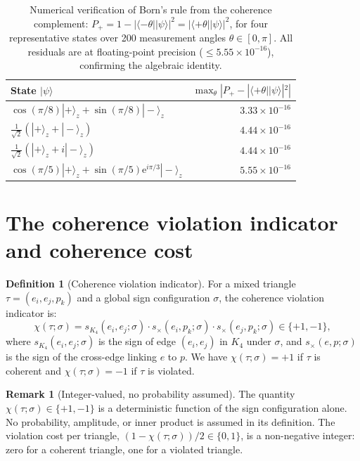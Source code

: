 \documentclass[11pt,a4paper]{article}
\theoremstyle{definition}
\newtheorem{definition}[theorem]{Definition}
\newtheorem{remark}[theorem]{Remark}
\newcommand{\Kfour}{K_4}
\newcommand{\pket}[1]{|#1\rangle}
\newcommand{\pbra}[1]{\langle#1|}
\begin{document}
\begin{table}[ht]
\centering
\caption{Numerical verification of Born's rule from the coherence complement: $P_+ = 1 - |\pbra{-\theta}\pket{\psi}|^2 = |\pbra{+\theta}\pket{\psi}|^2$, for four representative states over 200 measurement angles $\theta \in [0,\pi]$. All residuals are at floating-point precision ($\leq 5.55\times10^{-16}$), confirming the algebraic identity.}

\bigskip

\label{tab:born_check}
\begin{tabular}{lr}
\toprule
State $\pket{\psi}$ & $\max_\theta |P_+ - |\pbra{+\theta}\pket{\psi}|^2|$ \\
\midrule
$\cos(\pi/8)\pket{+}_z + \sin(\pi/8)\pket{-}_z$ & $3.33\times10^{-16}$ \\
$\tfrac{1}{\sqrt{2}}(\pket{+}_z + \pket{-}_z)$ & $4.44\times10^{-16}$ \\
$\tfrac{1}{\sqrt{2}}(\pket{+}_z + i\pket{-}_z)$ & $4.44\times10^{-16}$ \\
$\cos(\pi/5)\pket{+}_z + \sin(\pi/5)\mathrm{e}^{i\pi/3}\pket{-}_z$ & $5.55\times10^{-16}$ \\
\bottomrule
\end{tabular}
\end{table}

\section{The coherence violation indicator and coherence cost}
\label{sec:chi}

\begin{definition}[Coherence violation indicator]
\label{def:chi}
For a mixed triangle $\tau = (e_i, e_j, p_k)$ and a global sign configuration $\sigma$, the coherence violation indicator is:
\begin{equation}
\chi(\tau;\sigma) = s_{\Kfour}(e_i,e_j;\sigma) \cdot s_\times(e_i,p_k;\sigma) \cdot s_\times(e_j,p_k;\sigma) \in \{+1,-1\},
\label{eq:chi_def}
\end{equation}
where $s_{\Kfour}(e_i,e_j;\sigma)$ is the sign of edge $(e_i,e_j)$ in $\Kfour$ under $\sigma$, and $s_\times(e,p;\sigma)$ is the sign of the cross-edge linking $e$ to $p$. We have $\chi(\tau;\sigma) = +1$ if $\tau$ is coherent and $\chi(\tau;\sigma) = -1$ if $\tau$ is violated.
\end{definition}

\begin{remark}[Integer-valued, no probability assumed]
The quantity $\chi(\tau;\sigma) \in \{+1,-1\}$ is a deterministic function of the sign configuration alone. No probability, amplitude, or inner product is assumed in its definition. The violation cost per triangle, $(1-\chi(\tau;\sigma))/2 \in \{0,1\}$, is a non-negative integer: zero for a coherent triangle, one for a violated triangle.
\end{remark}
\end{document}
